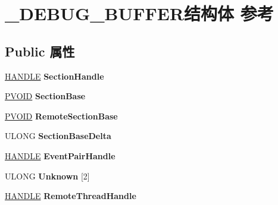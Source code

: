 \hypertarget{struct___d_e_b_u_g___b_u_f_f_e_r}{}\section{\+\_\+\+D\+E\+B\+U\+G\+\_\+\+B\+U\+F\+F\+E\+R结构体 参考}
\label{struct___d_e_b_u_g___b_u_f_f_e_r}
\subsection*{Public 属性}
\begin{DoxyCompactItemize}
\item 
\mbox{\label{struct___d_e_b_u_g___b_u_f_f_e_r_a4d1547ca3708b6e92338c02c71a27664}} 
\hyperlink{interfacevoid}{H\+A\+N\+D\+LE} {\bfseries Section\+Handle}
\item 
\mbox{\label{struct___d_e_b_u_g___b_u_f_f_e_r_ad4275d72fe0ee3ef2678f91aac47b798}} 
\hyperlink{interfacevoid}{P\+V\+O\+ID} {\bfseries Section\+Base}
\item 
\mbox{\label{struct___d_e_b_u_g___b_u_f_f_e_r_aaf59c1f113b24b7e3954eda1dd188259}} 
\hyperlink{interfacevoid}{P\+V\+O\+ID} {\bfseries Remote\+Section\+Base}
\item 
\mbox{\label{struct___d_e_b_u_g___b_u_f_f_e_r_a817cfdd5acc63173391af39abb50e80d}} 
U\+L\+O\+NG {\bfseries Section\+Base\+Delta}
\item 
\mbox{\label{struct___d_e_b_u_g___b_u_f_f_e_r_a49eaaf1f78babf55efee401a8bf884ca}} 
\hyperlink{interfacevoid}{H\+A\+N\+D\+LE} {\bfseries Event\+Pair\+Handle}
\item 
\mbox{\label{struct___d_e_b_u_g___b_u_f_f_e_r_a06764cfae2fde82b9260ec8ed6b40726}} 
U\+L\+O\+NG {\bfseries Unknown} \mbox{[}2\mbox{]}
\item 
\mbox{\label{struct___d_e_b_u_g___b_u_f_f_e_r_ae8811b3178cf4005c60dfb8f0803e3cc}} 
\hyperlink{interfacevoid}{H\+A\+N\+D\+LE} {\bfseries Remote\+Thread\+Handle}
\item 

\end{DoxyCompactItemize}

